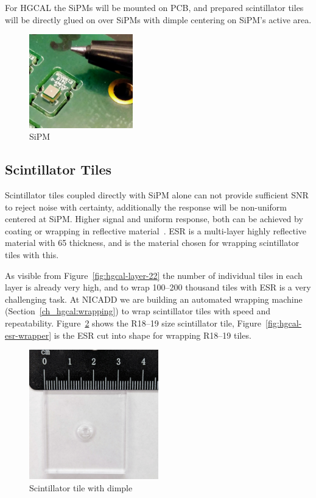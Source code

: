 For \gls{HGCAL} the \glspl{SiPM} will be mounted on \gls{PCB},
and prepared scintillator tiles will be directly glued on
over \glspl{SiPM} with dimple centering on \gls{SiPM}'s active area.

\begin{figure}[!ht]
  \centering
  \includegraphics[width=0.4\textwidth]{figures/hgcal/sipm.jpg}
  \caption[SiPM]{SiPM}%
  \label{fig:hgcal-sipm}
\end{figure}

\subsection{
  Scintillator Tiles
}\label{ch_hgcal:scint-tiles}

Scintillator tiles coupled directly with \gls{SiPM} alone can not provide
sufficient \gls{SNR} to reject noise with certainty, additionally
the response will be non-uniform centered at \gls{SiPM}. Higher
signal and uniform response, both can be achieved by coating or wrapping in reflective
material~\cite{niu-sipm-on-tile}. \gls{ESR}
is a multi-layer highly reflective material with 65\micron{} thickness,
and is the material chosen for wrapping scintillator tiles with this.

As visible from Figure~\ref{fig:hgcal-layer-22} the number
of individual tiles in each layer is already very high, and to wrap
100--200 thousand tiles with \gls{ESR} is a very challenging task.
At \gls{NICADD} we are building an automated wrapping machine (Section~\ref{ch_hgcal:wrapping}) to
wrap scintillator tiles with speed and repeatability.
Figure~\ref{fig:hgcal-scintillator-tile} shows the
R18--19 size scintillator tile, Figure~\ref{fig:hgcal-esr-wrapper}
is the \gls{ESR} cut into shape for wrapping R18--19 tiles.

\begin{figure}[!ht]
  \centering
  \includegraphics[width=0.5\textwidth]{figures/hgcal/tile_19.jpg}
  \caption[Scintillator tile with dimple]{Scintillator tile with dimple}%
  \label{fig:hgcal-scintillator-tile}
\end{figure}

